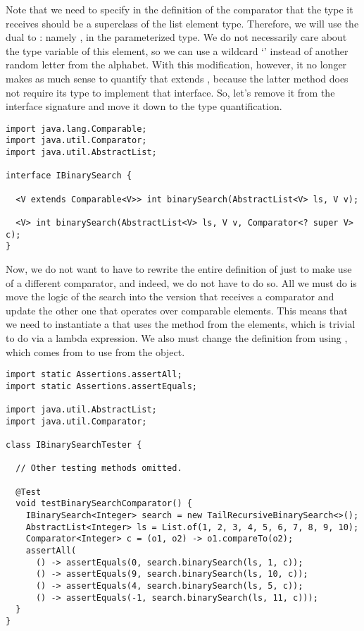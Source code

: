 Note that we need to specify in the definition of the comparator that the type it receives should be a superclass of the list element type. 
Therefore, we will use the dual to : namely , in the parameterized type.
We do not necessarily care about the type variable of this element, so we can use a wildcard `' instead of another random letter from the alphabet. 
With this modification, however, it no longer makes as much sense to quantify that  extends , because the latter method does not require its type to implement that interface. 
So, let's remove it from the interface signature and move it down to the type quantification.

\begin{lstlisting}[language=MyJava]
import java.lang.Comparable;
import java.util.Comparator;
import java.util.AbstractList;

interface IBinarySearch {

  <V extends Comparable<V>> int binarySearch(AbstractList<V> ls, V v);

  <V> int binarySearch(AbstractList<V> ls, V v, Comparator<? super V> c);
}
\end{lstlisting}

Now, we do not want to have to rewrite the entire definition of  just to make use of a different comparator, and indeed, we do not have to do so. 
All we must do is move the logic of the search into the version that receives a comparator and update the other one that operates over comparable elements. 
This means that we need to instantiate a  that uses the  method from the elements, which is trivial to do via a lambda expression. 
We also must change the definition from using , which comes from  to use  from the  object.

\begin{lstlisting}[language=MyJava]
import static Assertions.assertAll;
import static Assertions.assertEquals;

import java.util.AbstractList;
import java.util.Comparator;

class IBinarySearchTester {

  // Other testing methods omitted.

  @Test
  void testBinarySearchComparator() {
    IBinarySearch<Integer> search = new TailRecursiveBinarySearch<>();
    AbstractList<Integer> ls = List.of(1, 2, 3, 4, 5, 6, 7, 8, 9, 10);
    Comparator<Integer> c = (o1, o2) -> o1.compareTo(o2);
    assertAll(
      () -> assertEquals(0, search.binarySearch(ls, 1, c));
      () -> assertEquals(9, search.binarySearch(ls, 10, c));
      () -> assertEquals(4, search.binarySearch(ls, 5, c));
      () -> assertEquals(-1, search.binarySearch(ls, 11, c)));
  }
}
\end{lstlisting}

